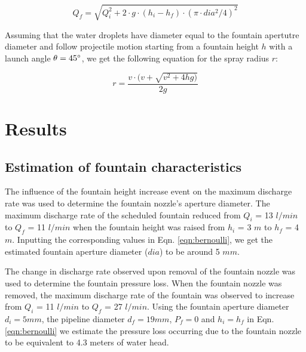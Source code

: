 \documentclass[tc, manuscript]{copernicus}
\begin{document}
\begin{equation}
  \label{eqn:discharge}
  Q_f = \sqrt{Q_i^2 + 2 \cdot g \cdot (h_i-h_f) \cdot (\pi \cdot dia^2/4)^2}
\end{equation}

Assuming that the water droplets have diameter equal to the fountain apertutre diameter and follow projectile
motion starting from a fountain height $h$ with a launch angle $\theta = 45 ^{\circ}$, we get the following
equation for the spray radius $r$:

\begin{equation}
  \label{eqn:radf}
  r = \frac{v \cdot(v + \sqrt{v^2 + 4hg)}}{2g}
\end{equation}

\section{Results}

\subsection{Estimation of fountain characteristics}

The influence of the fountain height increase event on the maximum discharge rate was used to determine the
fountain nozzle's aperture diameter. The maximum discharge rate of the scheduled fountain reduced from $Q_i$ =
13 $l/min$ to $Q_f$ = 11 $l/min$ when the fountain height was raised from  $h_i$ = 3 $m$ to $h_f$ = 4 $m$.
Inputting the corresponding values in Eqn. \ref{eqn:bernoulli}, we get the estimated fountain aperture diameter
($dia$) to be around 5 $mm$. 

The change in discharge rate observed upon removal of the fountain nozzle was used to determine the fountain
pressure loss. When the fountain nozzle was removed, the maximum discharge rate of the fountain was observed to
increase from $Q_{i}$ = 11 $l/min$ to $Q_{f}$ = 27 $l/min$. Using the fountain aperture diameter $d_i = 5 mm$,
the pipeline diameter $d_f = 19 mm$, $P_{f} = 0$ and $h_{i} = h_{f}$ in Eqn. \ref{eqn:bernoulli} we estimate the
pressure loss occurring due to the fountain nozzle to be equivalent to 4.3 meters of water head.
\end{document}
